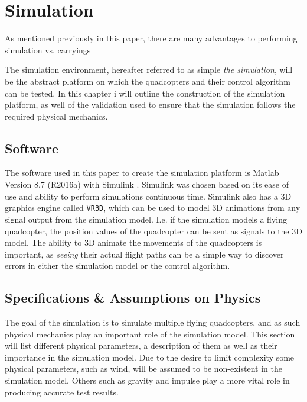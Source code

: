 
\chapter{Simulation}
\label{chap:simulation}
As mentioned previously in this paper, there are many advantages to performing simulation vs. carryings 


The simulation environment, hereafter referred to as simple \textit{the simulation}, will be the abstract platform on which the quadcopters and their control algorithm can be tested. 
In this chapter i will outline the construction of the simulation platform, as well of the validation used to ensure that the simulation follows the required physical mechanics. 

\section{Software}
The software used in this paper to create the simulation platform is Matlab Version 8.7 (R2016a) with Simulink \cite{_matlab_2016}. Simulink was chosen based on its ease of use and ability to perform simulations continuous time. Simulink also has a 3D graphics engine called \texttt{VR3D}\cite{_matlab_2016}, which can be used to model 3D animations from any signal output from the simulation model. I.e. if the simulation models a flying quadcopter, the position values of the quadcopter can be sent as signals to the 3D model. The ability to 3D animate the movements of the quadcopters is important, as \textit{seeing} their actual flight paths can be a simple way to discover errors in either the simulation model or the control algorithm. 

\section{Specifications \& Assumptions on Physics}
\label{sec:physics}

The goal of the simulation is to simulate multiple flying quadcopters, and as such physical mechanics play an important role of the simulation model. This section will list different physical parameters, a description of them as well as their importance in the simulation model. Due to the desire to limit complexity some physical parameters, such as wind, will be assumed to be non-existent in the simulation model. Others such as gravity and impulse play a more vital role in producing accurate test results.

